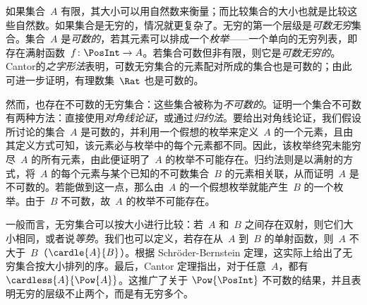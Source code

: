 如果集合~$A$ 有限，其大小可以用自然数来衡量；而比较集合的大小也就是比较这些自然数。如果集合是无穷的，情况就更复杂了。无穷的第一个层级是\emph{可数无穷}集合。集合~$A$ 是\emph{可数的}，若其元素可以排成一个\emph{枚举}——一个单向的无穷列表，即存在满射函数~$f\colon \PosInt \to A$。若集合可数但非有限，则它是\emph{可数无穷的}。Cantor的\emph{之字形法}表明，可数无穷集合的元素配对所成的集合也是可数的；由此可进一步证明，有理数集~$\Rat$ 也是可数的。

然而，也存在不可数的无穷集合：这些集合被称为\emph{不可数的}。证明一个集合不可数有两种方法：直接使用\emph{对角线论证}，或通过\emph{归约法}。要给出对角线论证，我们假设所讨论的集合~$A$ 是可数的，并利用一个假想的枚举来定义~$A$ 的一个元素，且由其定义方式可知，该元素必与枚举中的每个元素都不同。因此，该枚举终究未能穷尽~$A$ 的所有元素，由此便证明了~$A$ 的枚举不可能存在。归约法则是以满射的方式，将~$A$ 的每个元素与某个已知的不可数集合~$B$ 的元素相关联，从而证明~$A$ 是不可数的。若能做到这一点，那么由~$A$ 的一个假想枚举就能产生~$B$ 的一个枚举。由于~$B$ 不可数，故~$A$ 的枚举不可能存在。

一般而言，无穷集合可以按大小进行比较：若~$A$ 和~$B$ 之间存在双射，则它们大小相同，或者说\emph{等势}。我们也可以定义，若存在从~$A$ 到~$B$ 的单射函数，则~$A$ 不大于~$B$（$\cardle{A}{B}$）。根据 Schröder-Bernstein 定理，这实际上给出了无穷集合按大小排列的序。最后，Cantor 定理指出，对于任意~$A$，都有 $\cardless{A}{\Pow{A}}$。这推广了关于 $\Pow{\PosInt}$ 不可数的结果，并且表明无穷的层级不止两个，而是有无穷多个。